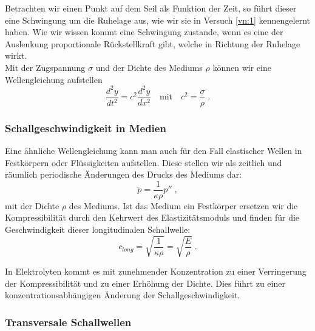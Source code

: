 \noindent
Betrachten wir einen Punkt auf dem Seil als Funktion der Zeit, so führt dieser eine Schwingung um die Ruhelage aus, wie wir sie in Versuch \ref{vn:1} kennengelernt haben. Wie wir wissen kommt eine Schwingung zustande, wenn es eine der Auslenkung proportionale Rückstellkraft gibt, welche in Richtung der Ruhelage wirkt.\\
Mit der Zugspannung $\sigma$ und der Dichte des Mediums $\rho$ können wir eine Wellengleichung aufstellen
\begin{equation*}
	\frac{d^2 y}{dt^2} = c^2\frac{d^2 y}{dx^2}\quad \mathrm{mit}\quad c^2 = \frac{\sigma}{\rho}\; .
\end{equation*}

\subsubsection{Schallgeschwindigkeit in Medien}

Eine ähnliche Wellengleichung kann man auch für den Fall elastischer Wellen in Festkörpern oder Flüssigkeiten aufstellen. Diese stellen wir als zeitlich und räumlich periodische Änderungen des Drucks des Mediums dar:
\begin{equation*}
	\ddot{p} = \frac{1}{\kappa\rho} p''\; ,
\end{equation*}
mit der Dichte $\rho$ des Mediums. Ist das Medium ein Festkörper ersetzen wir die Kompressibilität durch den Kehrwert des Elastizitätsmoduls und finden für die Geschwindigkeit dieser longitudinalen Schallwelle:
\begin{equation}
	c_{long} = \sqrt{\frac{1}{\kappa\rho}} = \sqrt{\frac{E}{\rho}}\; .
\end{equation}

In Elektrolyten kommt es mit zunehmender Konzentration zu einer Verringerung der Kompressibilität und zu einer Erhöhung der Dichte. Dies führt zu einer konzentrationsabhängigen Änderung der Schallgeschwindigkeit.

\subsubsection{Transversale Schallwellen}


